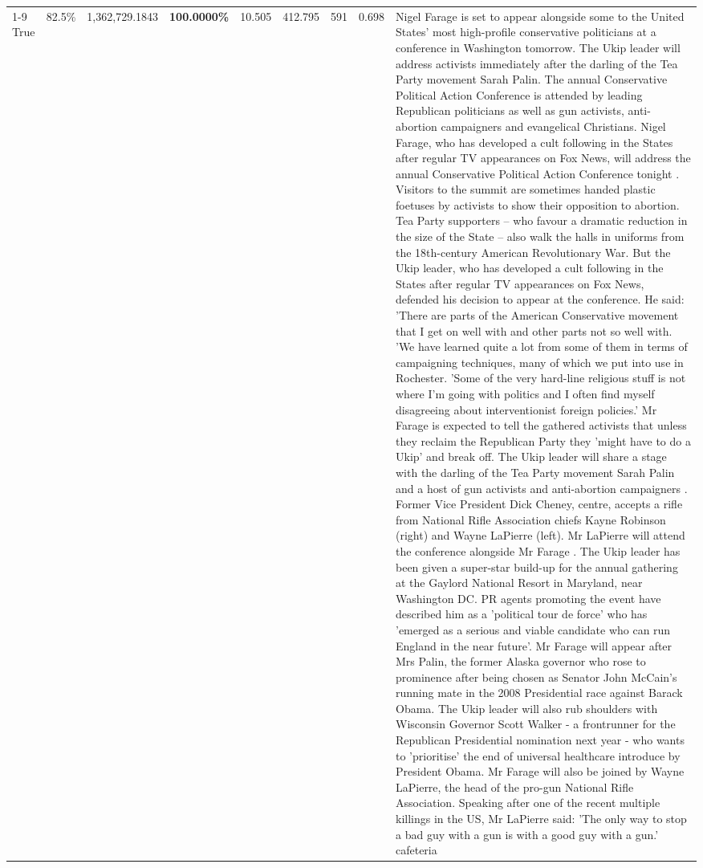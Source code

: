 \begin{table}[H]
\begin{tabular}{lllrlllll}
\cline{1-9}
True & 82.5\% & 1,362,729.1843 & \bfseries \color{red} 100.0000\% & 10.505 & 412.795 & 591 & 0.698 & Nigel Farage is set to appear alongside some to the United States' most high-profile conservative politicians at a conference in Washington tomorrow. The Ukip leader will address activists immediately after the darling of the Tea Party movement Sarah Palin. The annual Conservative Political Action Conference is attended by leading Republican politicians as well as gun activists, anti-abortion campaigners and evangelical Christians. Nigel Farage, who has developed a cult following in the States after regular TV appearances on Fox News, will address the annual Conservative Political Action Conference tonight . Visitors to the summit are sometimes handed plastic foetuses by activists to show their opposition to abortion. Tea Party supporters – who favour a dramatic reduction in the size of the State – also walk the halls in uniforms from the 18th-century American Revolutionary War. But the Ukip leader, who has developed a cult following in the States after regular TV appearances on Fox News, defended his decision to appear at the conference. He said: 'There are parts of the American Conservative movement that I get on well with and other parts not so well with. 'We have learned quite a lot from some of them in terms of campaigning techniques, many of which we put into use in Rochester. 'Some of the very hard-line religious stuff is not where I'm going with politics and I often find myself disagreeing about interventionist foreign policies.' Mr Farage is expected to tell the gathered activists that unless they reclaim the Republican Party they 'might have to do a Ukip' and break off. The Ukip leader will share a stage with the darling of the Tea Party movement Sarah Palin and a host of gun activists and anti-abortion campaigners . Former Vice President Dick Cheney, centre, accepts a rifle from National Rifle Association chiefs Kayne Robinson (right) and Wayne LaPierre (left). Mr LaPierre will attend the conference alongside Mr Farage . The Ukip leader has been given a super-star build-up for the annual gathering at the Gaylord National Resort in Maryland, near Washington DC. PR agents promoting the event have described him as a 'political tour de force' who has 'emerged as a serious and viable candidate who can run England in the near future'. Mr Farage will appear after Mrs Palin, the former Alaska governor who rose to prominence after being chosen as Senator John McCain's running mate in the 2008 Presidential race against Barack Obama. The Ukip leader will also rub shoulders with Wisconsin Governor Scott Walker - a frontrunner for the Republican Presidential nomination next year - who wants to 'prioritise' the end of universal healthcare introduce by President Obama. Mr Farage will also be joined by Wayne LaPierre, the head of the pro-gun National Rifle Association. Speaking after one of the recent multiple killings in the US, Mr LaPierre said: 'The only way to stop a bad guy with a gun is with a good guy with a gun.' cafeteria \\

\end{tabular}
\end{table}
